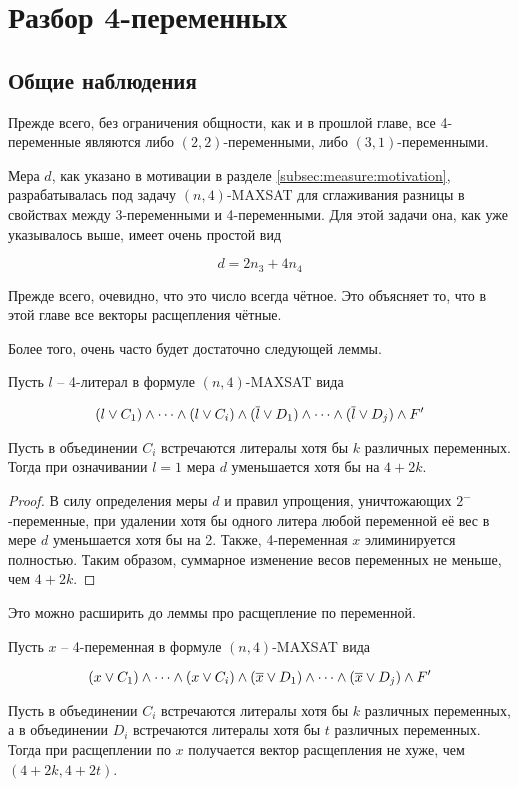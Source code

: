 
\section{Разбор 4-переменных}
\label{sec:n4}

\subsection{Общие наблюдения}
\label{subsec:n4:observations}

\firstpar{}Прежде всего, без ограничения общности, как и в прошлой главе, все 4-переменные являются либо $(2,2)$-переменными, либо $(3,1)$-переменными.

Мера $d$, как указано в мотивации в разделе \ref{subsec:measure:motivation}, разрабатывалась под задачу $(n,4)$-MAXSAT для сглаживания разницы в свойствах между 3-переменными и 4-переменными. Для этой задачи она, как уже указывалось выше, имеет очень простой вид

$$
 d = 2n_3 + 4n_4
$$

Прежде всего, очевидно, что это число всегда чётное. Это объясняет то, что в этой главе все векторы расщепления чётные.

Более того, очень часто будет достаточно следующей леммы.

\begin{lemma}
 Пусть $l$ -- 4-литерал в формуле $(n,4)$-MAXSAT вида

 $$
  (l \vee C_1) \wedge \dots \wedge (l \vee C_i) \wedge (\overline{l} \vee D_1) \wedge \dots \wedge (\overline{l} \vee D_j) \wedge F'
 $$

 Пусть в объединении $C_i$ встречаются литералы хотя бы $k$ различных переменных.
 Тогда при означивании $l = 1$ мера $d$ уменьшается хотя бы на $4 + 2k$.
 \label{lemma:n4:one-side}
\end{lemma}

\begin{proof}
 В силу определения меры $d$ и правил упрощения, уничтожающих $2^-$-переменные, при удалении хотя бы одного литера любой переменной её вес в мере $d$ уменьшается хотя бы на 2. Также, 4-переменная $x$ элиминируется полностью. Таким образом, суммарное изменение весов переменных не меньше, чем $4 + 2k$.
\end{proof}

Это можно расширить до леммы про расщепление по переменной.

\begin{lemma}
 Пусть $x$ -- 4-переменная в формуле $(n,4)$-MAXSAT вида

 $$
  (x \vee C_1) \wedge \dots \wedge (x \vee C_i) \wedge (\overline{x} \vee D_1) \wedge \dots \wedge (\overline{x} \vee D_j) \wedge F'
 $$

 Пусть в объединении $C_i$ встречаются литералы хотя бы $k$ различных переменных, а в объединении $D_i$ встречаются литералы хотя бы $t$ различных переменных.
 Тогда при расщеплении по $x$ получается вектор расщепления не хуже, чем $(4 + 2k, 4 + 2t)$.
 \label{lemma:n4:branch-on}
\end{lemma}

